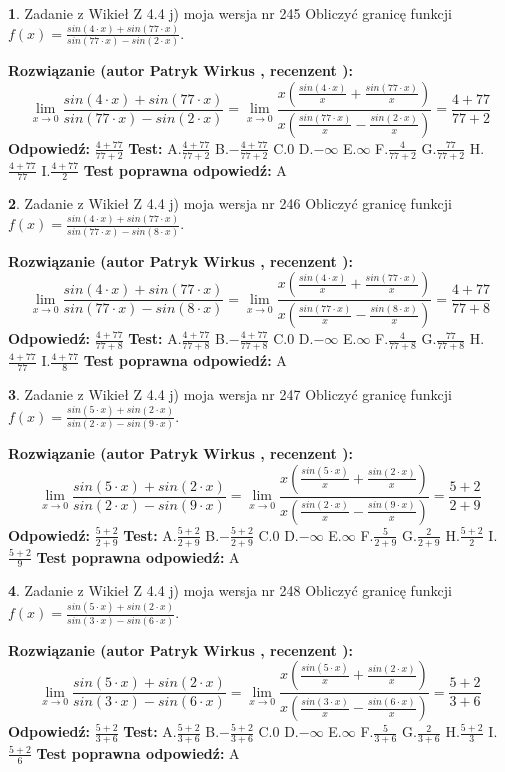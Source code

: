 \documentclass[12pt, a4paper]{article}
\theoremstyle{definition} %
\newtheorem{zad}{}
\newcommand{\zadStart}[1]{\begin{zad}#1\newline}
\newcommand{\zadStop}{\end{zad}}
\newcommand{\rozwStart}[2]{\noindent \textbf{Rozwiązanie (autor #1 , recenzent #2): }\newline}
\newcommand{\rozwStop}{\newline}
\newcommand{\odpStart}{\noindent \textbf{Odpowiedź:}\newline}
\newcommand{\odpStop}{\newline}
\newcommand{\testStart}{\noindent \textbf{Test:}\newline}
\newcommand{\testStop}{\newline}
\newcommand{\kluczStart}{\noindent \textbf{Test poprawna odpowiedź:}\newline}
\newcommand{\kluczStop}{\newline}
\begin{document}
\zadStart{Zadanie z Wikieł Z 4.4 j) moja wersja nr 245}
Obliczyć granicę funkcji $f(x)=\frac{sin(4\cdot x) +sin(77\cdot x)}{sin(77\cdot x) -sin(2\cdot x)}$.
\zadStop
\rozwStart{Patryk Wirkus}{}
$$\lim\limits_{x\to 0}\frac{sin(4\cdot x) +sin(77\cdot x)}{sin(77\cdot x) -sin(2\cdot x)}=\lim\limits_{x\to 0}\frac{x(\frac{sin(4\cdot x)}{x}+\frac{sin(77\cdot x)}{x})}{x(\frac{sin(77\cdot x)}{x}-\frac{sin(2\cdot x)}{x})}=\frac{4+77}{77+2}$$
\rozwStop
\odpStart
$\frac{4+77}{77+2}$
\odpStop
\testStart
A.$\frac{4+77}{77+2}$
B.$-\frac{4+77}{77+2}$
C.$0$
D.$-\infty$
E.$\infty$
F.$\frac{4}{77+2}$
G.$\frac{77}{77+2}$
H.$\frac{4+77}{77}$
I.$\frac{4+77}{2}$
\testStop
\kluczStart
A
\kluczStop



\zadStart{Zadanie z Wikieł Z 4.4 j) moja wersja nr 246}
Obliczyć granicę funkcji $f(x)=\frac{sin(4\cdot x) +sin(77\cdot x)}{sin(77\cdot x) -sin(8\cdot x)}$.
\zadStop
\rozwStart{Patryk Wirkus}{}
$$\lim\limits_{x\to 0}\frac{sin(4\cdot x) +sin(77\cdot x)}{sin(77\cdot x) -sin(8\cdot x)}=\lim\limits_{x\to 0}\frac{x(\frac{sin(4\cdot x)}{x}+\frac{sin(77\cdot x)}{x})}{x(\frac{sin(77\cdot x)}{x}-\frac{sin(8\cdot x)}{x})}=\frac{4+77}{77+8}$$
\rozwStop
\odpStart
$\frac{4+77}{77+8}$
\odpStop
\testStart
A.$\frac{4+77}{77+8}$
B.$-\frac{4+77}{77+8}$
C.$0$
D.$-\infty$
E.$\infty$
F.$\frac{4}{77+8}$
G.$\frac{77}{77+8}$
H.$\frac{4+77}{77}$
I.$\frac{4+77}{8}$
\testStop
\kluczStart
A
\kluczStop



\zadStart{Zadanie z Wikieł Z 4.4 j) moja wersja nr 247}
Obliczyć granicę funkcji $f(x)=\frac{sin(5\cdot x) +sin(2\cdot x)}{sin(2\cdot x) -sin(9\cdot x)}$.
\zadStop
\rozwStart{Patryk Wirkus}{}
$$\lim\limits_{x\to 0}\frac{sin(5\cdot x) +sin(2\cdot x)}{sin(2\cdot x) -sin(9\cdot x)}=\lim\limits_{x\to 0}\frac{x(\frac{sin(5\cdot x)}{x}+\frac{sin(2\cdot x)}{x})}{x(\frac{sin(2\cdot x)}{x}-\frac{sin(9\cdot x)}{x})}=\frac{5+2}{2+9}$$
\rozwStop
\odpStart
$\frac{5+2}{2+9}$
\odpStop
\testStart
A.$\frac{5+2}{2+9}$
B.$-\frac{5+2}{2+9}$
C.$0$
D.$-\infty$
E.$\infty$
F.$\frac{5}{2+9}$
G.$\frac{2}{2+9}$
H.$\frac{5+2}{2}$
I.$\frac{5+2}{9}$
\testStop
\kluczStart
A
\kluczStop



\zadStart{Zadanie z Wikieł Z 4.4 j) moja wersja nr 248}
Obliczyć granicę funkcji $f(x)=\frac{sin(5\cdot x) +sin(2\cdot x)}{sin(3\cdot x) -sin(6\cdot x)}$.
\zadStop
\rozwStart{Patryk Wirkus}{}
$$\lim\limits_{x\to 0}\frac{sin(5\cdot x) +sin(2\cdot x)}{sin(3\cdot x) -sin(6\cdot x)}=\lim\limits_{x\to 0}\frac{x(\frac{sin(5\cdot x)}{x}+\frac{sin(2\cdot x)}{x})}{x(\frac{sin(3\cdot x)}{x}-\frac{sin(6\cdot x)}{x})}=\frac{5+2}{3+6}$$
\rozwStop
\odpStart
$\frac{5+2}{3+6}$
\odpStop
\testStart
A.$\frac{5+2}{3+6}$
B.$-\frac{5+2}{3+6}$
C.$0$
D.$-\infty$
E.$\infty$
F.$\frac{5}{3+6}$
G.$\frac{2}{3+6}$
H.$\frac{5+2}{3}$
I.$\frac{5+2}{6}$
\testStop
\kluczStart
A
\kluczStop
\end{document}

